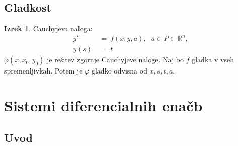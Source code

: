 \documentclass[11pt]{article}
\newcommand{\R}{\mathbb{R}}
\theoremstyle{definition}
\theoremstyle{definition}
\theoremstyle{definition}
\newtheorem{izrek}{Izrek}[section]
\theoremstyle{definition}
\begin{document}

\subsection{Gladkost}
\vspace{0.5cm}

\begin{izrek}

Cauchyjeva naloga:
\begin{align*}
y' ~&=~ f(x,y,a), ~~~a \in P \subset \R^n, \\
y(s) ~&=~ t
\end{align*}
$\varphi(x,x_0,y_0)$ je rešitev zgornje Cauchyjeve naloge.
Naj bo $f$ gladka v vseh spremenljivkah. Potem je $\varphi$ gladko odvisna od $x,s,t,a$.

\end{izrek}
\vspace{0.5cm}


\pagebreak


\section{Sistemi diferencialnih enačb}
\vspace{0.5cm}


\subsection{Uvod}
\vspace{0.5cm}
\end{document}
